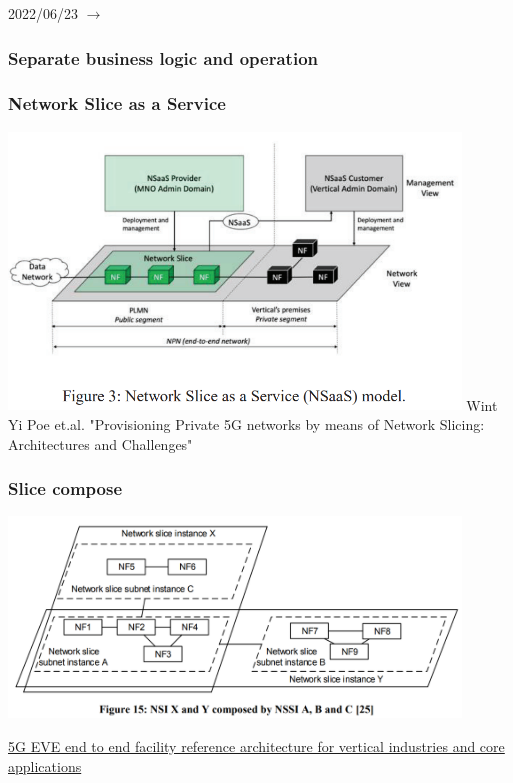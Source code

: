 \documentclass{beamer}
\begin{document}
\begin{frame}
  \Large{2022/06/23 $\rightarrow$}
\end{frame}



\begin{frame}
  \frametitle{Separate business logic and operation}
\end{frame}

\begin{frame}
  \frametitle{Network Slice as a Service}
  \center
  \includegraphics[width=0.9\textwidth]{images/ns-as-a-service}
  \tiny Wint Yi Poe et.al. "Provisioning Private 5G networks by means of
Network Slicing: Architectures and Challenges"
\end{frame}
 

\begin{frame}
  \frametitle{Slice compose}
  \center
  \includegraphics[width=0.9\textwidth]{images/ns-compose}
  
  \href{https://zenodo.org/record/3628333\#.YrLzD3XP2EJ}{\tiny{5G EVE end to end facility reference architecture for vertical industries and core applications}}
\end{frame}
\end{document}
